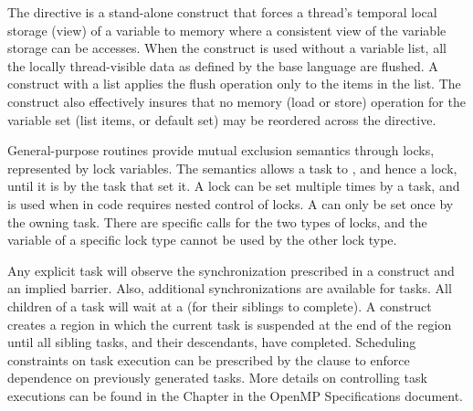 The  directive is a stand-alone construct that forces a thread's 
temporal local storage (view) of a variable to memory where a consistent view
of the variable storage can be accesses.  When the construct is used without 
a variable list, all the locally thread-visible data as defined by the 
base language are flushed.  A construct with a list applies the flush 
operation only to the items in the list.  The  construct also 
effectively insures that no memory (load or store) operation for
the variable set (list items, or default set) may be reordered across 
the  directive. 

General-purpose routines provide mutual exclusion semantics through locks, 
represented by lock variables.  
The semantics allows a task to , and hence 
 a lock, until it is  by the task that set it. A 
 lock can be set multiple times by a task, and is used
when in code requires nested control of locks.  A  can
only be set once by the owning task. There are specific calls for the two
types of locks, and the variable of a specific lock type cannot be used by the
other lock type.  

Any explicit task will observe the synchronization prescribed in a 
 construct and an implied barrier.  Also, additional synchronizations 
are available for tasks.  All children of a task will wait at a  (for 
their siblings to complete).  A  construct creates a region in which the
current task is suspended at the end of the region until all sibling tasks, 
and their descendants, have completed. 
Scheduling constraints on task execution can be prescribed by the 
clause to enforce dependence on previously generated tasks.
More details on controlling task executions can be found in the  Chapter
in the OpenMP Specifications document. %
